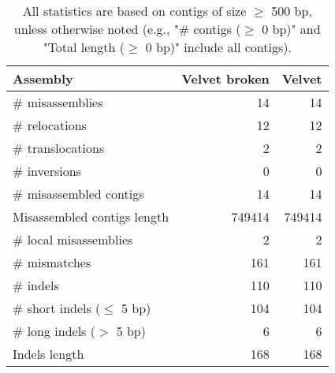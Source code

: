 \documentclass[12pt,a4paper]{article}
\begin{document}
\begin{table}[ht]
\begin{center}
\caption{All statistics are based on contigs of size $\geq$ 500 bp, unless otherwise noted (e.g., "\# contigs ($\geq$ 0 bp)" and "Total length ($\geq$ 0 bp)" include all contigs).}
\begin{tabular}{|l*{2}{|r}|}
\hline
Assembly & Velvet broken & Velvet \\ \hline
\# misassemblies & 14 & 14 \\ \hline
\hspace{5mm}\# relocations & 12 & 12 \\ \hline
\hspace{5mm}\# translocations & 2 & 2 \\ \hline
\hspace{5mm}\# inversions & 0 & 0 \\ \hline
\# misassembled contigs & 14 & 14 \\ \hline
Misassembled contigs length & 749414 & 749414 \\ \hline
\# local misassemblies & 2 & 2 \\ \hline
\# mismatches & 161 & 161 \\ \hline
\# indels & 110 & 110 \\ \hline
\hspace{5mm}\# short indels ($\leq$ 5 bp) & 104 & 104 \\ \hline
\hspace{5mm}\# long indels ($>$ 5 bp) & 6 & 6 \\ \hline
Indels length & 168 & 168 \\ \hline
\end{tabular}
\end{center}
\end{table}
\end{document}

